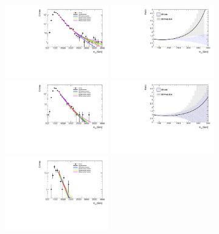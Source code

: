 \begin{figure}[htbp!]
\begin{center}
\includegraphics[angle=270, width=0.4\textwidth]{figures/boosted/Syst_Shape/QCDSysfitSmooth_22.pdf}
\includegraphics[angle=270, width=0.4\textwidth]{figures/boosted/Syst_Shape/QCDSysfitSmooth_ratio_22.pdf} \\
\includegraphics[angle=270, width=0.4\textwidth]{figures/boosted/Syst_Shape/QCDSysfitSmooth_33.pdf}
\includegraphics[angle=270, width=0.4\textwidth]{figures/boosted/Syst_Shape/QCDSysfitSmooth_ratio_33.pdf} \\
\includegraphics[angle=270, width=0.4\textwidth]{figures/boosted/Syst_Shape/QCDSysfitSmooth_44.pdf}

\end{center}
\end{figure}
